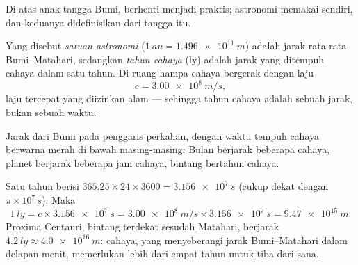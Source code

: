 Di atas anak tangga Bumi,  berhenti menjadi praktis; astronomi
memakai  sendiri, dan keduanya didefinisikan dari tangga itu.

\begin{definition}\label{def:g10:orders-of-magnitude:lightyear}
Yang disebut \emph{satuan astronomi}
($\qty{1}{au} = \qty{1.496e11}{m}$) adalah jarak rata-rata
Bumi--Matahari, sedangkan \emph{tahun cahaya}
(\unit{ly}) adalah jarak yang ditempuh cahaya dalam satu tahun. Di
ruang hampa cahaya bergerak dengan laju
\[
c = \qty{3.00e8}{m/s},
\]
laju tercepat yang diizinkan alam --- sehingga tahun cahaya adalah
sebuah jarak, bukan sebuah waktu.
\end{definition}

\begin{omfigure}

{\small Jarak dari Bumi pada penggaris perkalian, dengan waktu tempuh
cahaya berwarna merah di bawah masing-masing: Bulan berjarak beberapa
 cahaya, planet berjarak beberapa jam cahaya, bintang bertahun
cahaya.}
\end{omfigure}

\begin{example}\label{ex:g10:orders-of-magnitude:ly}
Satu tahun berisi $365.25 \times 24 \times 3600 = \qty{3.156e7}{s}$
(cukup dekat dengan $\pi \times 10^{7}\,\unit{s}$). Maka
\[
\qty{1}{ly} = c \times \qty{3.156e7}{s}
= \qty{3.00e8}{m/s} \times \qty{3.156e7}{s}
= \qty{9.47e15}{m}.
\]
Proxima Centauri, bintang terdekat sesudah Matahari, berjarak
$\qty{4.2}{ly} \approx \qty{4.0e16}{m}$: cahaya, yang menyeberangi
jarak Bumi--Matahari dalam delapan menit, memerlukan lebih dari empat
tahun untuk tiba dari sana.
\end{example}

